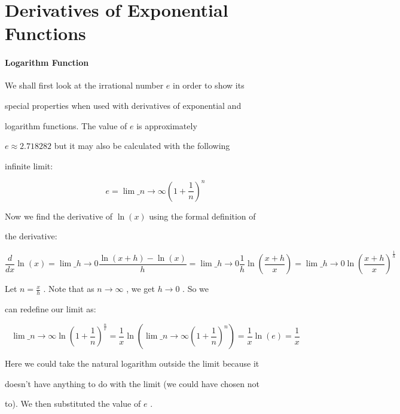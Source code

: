 \section{Derivatives of Exponential Functions}
\label{sec:derivatives-of-exponential-functions}

\paragraph{Logarithm Function}



We shall first look at the irrational number $e$ in order to show its

special properties when used with derivatives of exponential and

logarithm functions. The value of $e$ is approximately

$e\approx2.718282$ but it may also be calculated with the following

infinite limit:



$$e=\lim\_{n\to\infty}\left(1+\frac{1}{n}\right)^n$$



Now we find the derivative of $\ln(x)$ using the formal definition of

the derivative:



$$\frac{d}{dx}\ln(x)=\lim\_{h\to0}\frac{\ln(x+h)-\ln(x)}{h}=\lim\_{h\to0}\frac{1}{h}\ln\left(\frac{x+h}{x}\right)=\lim\_{h\to0}\ln\left(\frac{x+h}{x}\right)^\frac{1}{h}$$



Let $n=\frac{x}{h}$ . Note that as $n\to\infty$ , we get $h\to0$ . So we

can redefine our limit as:



$$\lim\_{n\to\infty}\ln\left(1+\frac{1}{n}\right)^\frac{n}{x}=\frac{1}{x}\ln\left(\lim\_{n\to\infty}\left(1+\frac{1}{n}\right)^n\right)=\frac{1}{x}\ln(e)=\frac{1}{x}$$



Here we could take the natural logarithm outside the limit because it

doesn't have anything to do with the limit (we could have chosen not

to). We then substituted the value of $e$ .



